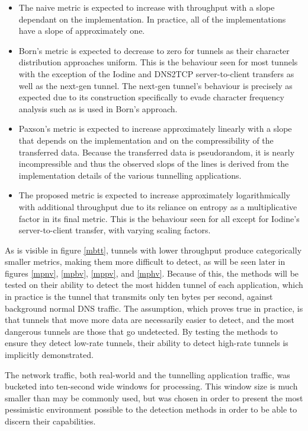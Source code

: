\documentclass[12pt]{report}
\theoremstyle{remark}
\theoremstyle{definition}
\theoremstyle{definition}
\theoremstyle{definition}
\begin{document}
\begin{itemize}
\item The naive metric is expected to increase with throughput with a slope
dependant on the implementation. In practice, all of the implementations have a
slope of approximately one.

\item Born's metric is expected to decrease to zero for tunnels as their
character distribution approaches uniform. This is the behaviour seen for most
tunnels with the exception of the Iodine and DNS2TCP server-to-client transfers
as well as the next-gen tunnel. The next-gen tunnel's behaviour is precisely as
expected due to its construction specifically to evade character frequency
analysis such as is used in Born's approach.

\item Paxson's metric is expected to increase approximately linearly with a
slope that depends on the implementation and on the compressibility of the
transferred data. Because the transferred data is pseudorandom, it is nearly
incompressible and thus the observed slops of the lines is derived from the
implementation details of the various tunnelling applications.

\item The proposed metric is expected to increase approximately logarithmically
with additional throughput due to its reliance on entropy as a multiplicative factor in its final metric. This is the
behaviour seen for all except for Iodine's server-to-client transfer, with
varying scaling factors.
\end{itemize}

As is visible in figure \ref{mbtt}, tunnels with lower throughput produce
categorically smaller metrics, making them more difficult to detect,
as will be seen later in figures \ref{mpnv}, \ref{mpbv}, \ref{mppv}, and
\ref{mphv}. Because of this, the methods will be tested on their ability to
detect the most hidden tunnel of each application, which in practice is the
tunnel that transmits only ten bytes per second, against background normal DNS
traffic. The assumption, which proves true in practice, is that tunnels that
move more data are necessarily easier to detect, and the most dangerous tunnels
are those that go undetected. By testing the methods to ensure they detect
low-rate tunnels, their ability to detect high-rate tunnels is implicitly
demonstrated.

The network traffic, both real-world and the tunnelling application traffic, was
bucketed into ten-second wide windows for processing. This window size is much
smaller than may be commonly used, but was chosen in order to present the most
pessimistic environment possible to the detection methods in order to be able to
discern their capabilities.
\end{document}

